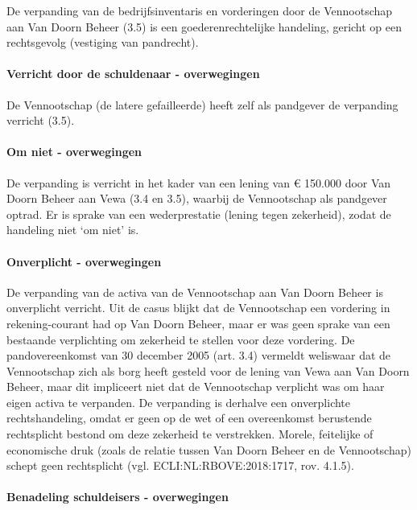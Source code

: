 \documentclass[
  dutch,
  a4paper,
]{article}
\begin{document}
De verpanding van de bedrijfsinventaris en vorderingen door de Vennootschap aan Van Doorn Beheer (3.5) is een goederenrechtelijke handeling, gericht op een rechtsgevolg (vestiging van pandrecht).

\paragraph{Verricht door de schuldenaar - overwegingen}\label{verricht-door-de-schuldenaar---overwegingen-6}

De Vennootschap (de latere gefailleerde) heeft zelf als pandgever de verpanding verricht (3.5).

\paragraph{Om niet - overwegingen}\label{om-niet---overwegingen-6}

De verpanding is verricht in het kader van een lening van € 150.000 door Van Doorn Beheer aan Vewa (3.4 en 3.5), waarbij de Vennootschap als pandgever optrad. Er is sprake van een wederprestatie (lening tegen zekerheid), zodat de handeling niet `om niet' is.

\paragraph{Onverplicht - overwegingen}\label{onverplicht---overwegingen-6}

De verpanding van de activa van de Vennootschap aan Van Doorn Beheer is onverplicht verricht. Uit de casus blijkt dat de Vennootschap een vordering in rekening-courant had op Van Doorn Beheer, maar er was geen sprake van een bestaande verplichting om zekerheid te stellen voor deze vordering. De pandovereenkomst van 30 december 2005 (art. 3.4) vermeldt weliswaar dat de Vennootschap zich als borg heeft gesteld voor de lening van Vewa aan Van Doorn Beheer, maar dit impliceert niet dat de Vennootschap verplicht was om haar eigen activa te verpanden. De verpanding is derhalve een onverplichte rechtshandeling, omdat er geen op de wet of een overeenkomst berustende rechtsplicht bestond om deze zekerheid te verstrekken. Morele, feitelijke of economische druk (zoals de relatie tussen Van Doorn Beheer en de Vennootschap) schept geen rechtsplicht (vgl. ECLI:NL:RBOVE:2018:1717, rov. 4.1.5).

\paragraph{Benadeling schuldeisers - overwegingen}\label{benadeling-schuldeisers---overwegingen-6}
\end{document}
